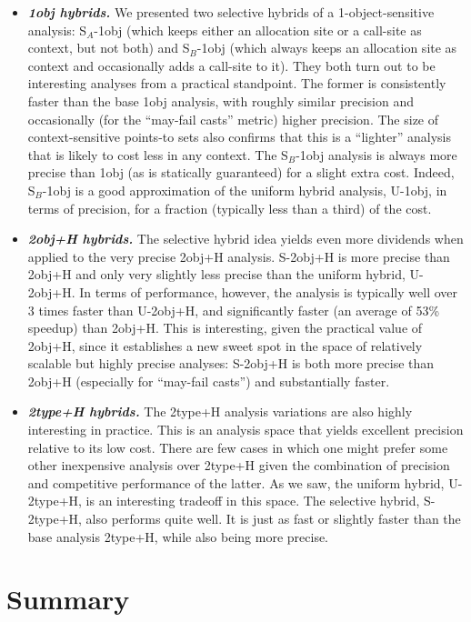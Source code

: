 \begin{itemize}
\item \textbf{\emph{1obj hybrids.}}
We presented two selective hybrids of a 1-object-sensitive analysis: S$_A$-1obj (which keeps either an allocation site or a call-site as context, but not both) and S$_B$-1obj (which always keeps an allocation site as context and occasionally adds a call-site to it). They both turn out to be interesting analyses from a practical standpoint. The former is consistently faster than the base 1obj analysis, with roughly similar precision and occasionally (for the ``may-fail casts'' metric) higher precision. The size of context-sensitive points-to sets also confirms that this is a ``lighter'' analysis that is likely to cost less in any context. The S$_B$-1obj analysis is always more precise than 1obj (as is statically guaranteed) for a slight extra cost. Indeed, S$_B$-1obj is a good approximation of the uniform hybrid analysis, U-1obj, in terms of precision, for a fraction (typically less than a third) of the cost.

\item \textbf{\emph{2obj+H hybrids.}}
The selective hybrid idea yields even more dividends when applied to the very precise 2obj+H analysis. S-2obj+H is more precise than 2obj+H and only very slightly less precise than the uniform hybrid, U-2obj+H. In terms of performance, however, the analysis is typically well over 3 times faster than U-2obj+H, and significantly faster (an average of 53\% speedup) than 2obj+H. This is interesting, given the practical value of 2obj+H, since it establishes a new sweet spot in the space of relatively scalable but highly precise analyses: S-2obj+H is both more precise than 2obj+H (especially for ``may-fail casts'') and substantially faster.

\item \textbf{\emph{2type+H hybrids.}}
The 2type+H analysis variations are also highly interesting in practice. This is an analysis space that yields excellent precision relative to its low cost. There are few cases in which one might prefer some other inexpensive analysis over 2type+H given the combination of precision and competitive performance of the latter. As we saw, the uniform hybrid, U-2type+H, is an interesting tradeoff in this space. The selective hybrid, S-2type+H, also performs quite well. It is just as fast or slightly faster than the base analysis 2type+H, while also being more precise.
\end{itemize}


\section{Summary}

